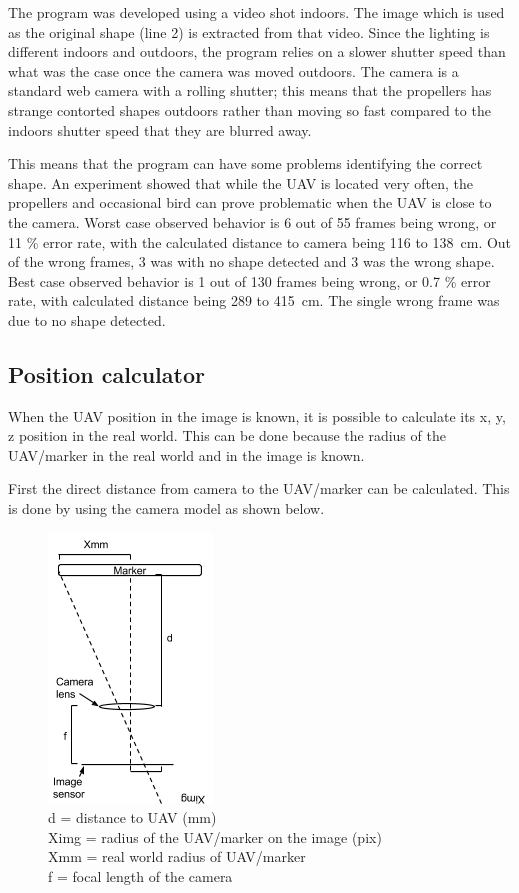 The program was developed using a video shot indoors. The image which is used as the original shape (line 2) is extracted from that video. Since the lighting is different indoors and outdoors, the program relies on a slower shutter speed than what was the case once the camera was moved outdoors. The camera is a standard web camera with a rolling shutter; this means that the propellers has strange contorted shapes outdoors rather than moving so fast compared to the indoors shutter speed that they are blurred away. 

This means that the program can have some problems identifying the correct shape. An experiment showed that while the UAV is located very often, the propellers and occasional bird can prove problematic when the UAV is close to the camera. Worst case observed behavior is 6 out of 55 frames being wrong, or 11 \% error rate, with the calculated distance to camera being 116 to \SI{138}{\centi\meter}. Out of the wrong frames, 3 was with no shape detected and 3 was the wrong shape. Best case observed behavior is 1 out of 130 frames being wrong, or 0.7 \% error rate, with calculated distance being 289 to \SI{415}{\centi\meter}. The single wrong frame was due to no shape detected.
\subsection{Position calculator}
When the UAV position in the image is known, it is possible to calculate its x, y, z position in the real world. This can be done because the radius of the UAV/marker in the real world and in the image is known. 

First the direct distance from camera to the UAV/marker can be calculated. This is done by using the camera model as shown below.
\begin{figure}[h!]
	\centering
	\includegraphics{imgs/focal_length}\\
	d = distance to UAV (\si{\milli\meter})\\
	Ximg = radius of the UAV/marker on the image (pix)\\
	Xmm = real world radius of UAV/marker\\
	f = focal length of the camera
\end{figure}


